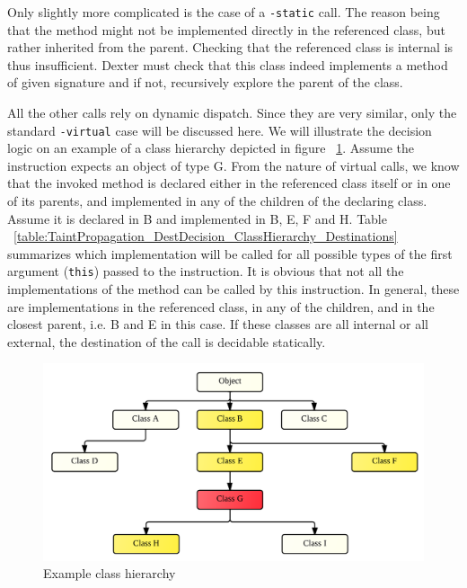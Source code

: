 \documentclass[12pt,twoside,notitlepage]{report}
\begin{document}
Only slightly more complicated is the case of a \verb$-static$ call. The reason being that the method might not be implemented directly in the referenced class, but rather inherited from the parent. Checking that the referenced class is internal is thus insufficient. Dexter must check that this class indeed implements a method of given signature and if not, recursively explore the parent of the class. 

All the other calls rely on dynamic dispatch. Since they are very similar, only the standard \verb$-virtual$ case will be discussed here. We will illustrate the decision logic on an example of a class hierarchy depicted in figure ~\ref{fig:TaintPropagation_DestDecision_ClassHierarchy}. Assume the instruction expects an object of type G. From the nature of virtual calls, we know that the invoked method is declared either in the referenced class itself or in one of its parents, and implemented in any of the children of the declaring class. Assume it is declared in B and implemented in B, E, F and H. Table ~\ref{table:TaintPropagation_DestDecision_ClassHierarchy_Destinations} summarizes which implementation will be called for all possible types of the first argument (\verb$this$) passed to the instruction. It is obvious that not all the implementations of the method can be called by this instruction. In general, these are implementations in the referenced class, in any of the children, and in the closest parent, i.e. B and E in this case. If these classes are all internal or all external, the destination of the call is decidable statically. 

\begin{figure}
	\includegraphics[width=\textwidth]{figs/fig_virtual_call_tree.png}
	\caption{Example class hierarchy}
	\label{fig:TaintPropagation_DestDecision_ClassHierarchy}
\end{figure}
\end{document}

